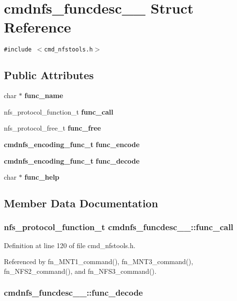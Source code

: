 \section{cmdnfs\_\-funcdesc\_\-\_\- Struct Reference}
\label{structcmdnfs__funcdesc____}
{\tt \#include $<$cmd\_\-nfstools.h$>$}

\subsection*{Public Attributes}
\begin{CompactItemize}
\item 
char $\ast$ {\bf func\_\-name}
\item 
nfs\_\-protocol\_\-function\_\-t {\bf func\_\-call}
\item 
nfs\_\-protocol\_\-free\_\-t {\bf func\_\-free}
\item 
{\bf cmdnfs\_\-encoding\_\-func\_\-t} {\bf func\_\-encode}
\item 
{\bf cmdnfs\_\-encoding\_\-func\_\-t} {\bf func\_\-decode}
\item 
char $\ast$ {\bf func\_\-help}
\end{CompactItemize}


\subsection{Member Data Documentation}
\subsubsection{\setlength{\rightskip}{0pt plus 5cm}nfs\_\-protocol\_\-function\_\-t {\bf cmdnfs\_\-funcdesc\_\-\_\-::func\_\-call}}\label{structcmdnfs__funcdesc_____o1}




Definition at line 120 of file cmd\_\-nfstools.h.

Referenced by fn\_\-MNT1\_\-command(), fn\_\-MNT3\_\-command(), fn\_\-NFS2\_\-command(), and fn\_\-NFS3\_\-command().
\subsubsection{ {\bf cmdnfs\_\-funcdesc\_\-\_\-::func\_\-decode}}\label{structcmdnfs__funcdesc_____o4}




